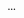 \vspace*{-5mm}
\begin{changemargin}{-7mm}{-7mm}
    
    \begin{debat}[...]
    \dots
    \end{debat}
\end{changemargin}